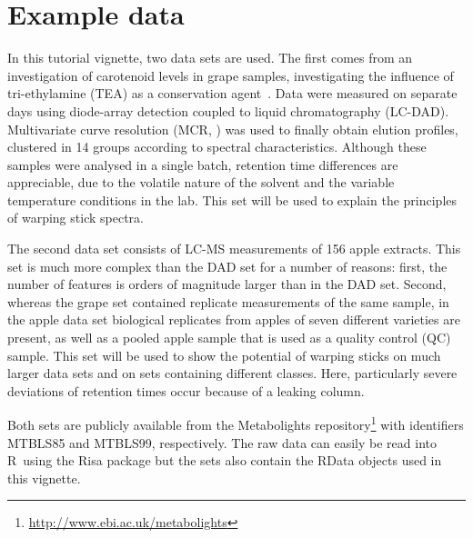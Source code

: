\documentclass[a4paper,11pt]{article}
\newcommand{\pkg}[1]{{\normalfont\fontseries{b}\selectfont #1}}
\newcommand{\proglang}[1]{{\sffamily #1}}
\newcommand{\R}{\proglang{R}}
\begin{document}
\section{Example data}
In this tutorial vignette, two data sets are used. The first comes
from an investigation of carotenoid levels in grape samples,
investigating the influence of tri-ethylamine (TEA) as a conservation
agent~\citep{Wehrens2015}. Data were measured on separate days using
diode-array detection coupled to liquid chromatography
(LC-DAD). Multivariate curve resolution (MCR, \citet{Juan2006}) was
used to finally obtain elution profiles, clustered in 14 groups according to
spectral characteristics. Although these samples were analysed in a
single batch, retention time differences are appreciable, due to the
volatile nature of the solvent and the variable temperature conditions
in the lab. This set will be used to explain the principles of warping
stick spectra.

The second data set consists of LC-MS measurements of 156 apple
extracts. This set is much more complex than the DAD set for a number
of reasons: first, the number of features is orders of magnitude
larger than in the DAD set. Second, whereas the grape set contained
replicate measurements of the same sample, in the apple data set
biological replicates from apples of seven different varieties are
present, as well as a pooled apple sample that is used as a quality
control (QC) sample. This set will be used to show the potential of warping
sticks on much larger data sets and on sets containing different classes.
Here, particularly severe deviations of retention times
occur because of a leaking column. 

Both sets are publicly available from the Metabolights 
repository\footnote{\url{http://www.ebi.ac.uk/metabolights}} with
identifiers MTBLS85 and MTBLS99, respectively. The raw data can easily
be read into \R\ using the \pkg{Risa} package \citep{Gonzalez2014} but
the sets also contain the RData objects used in this vignette.

\end{document}
